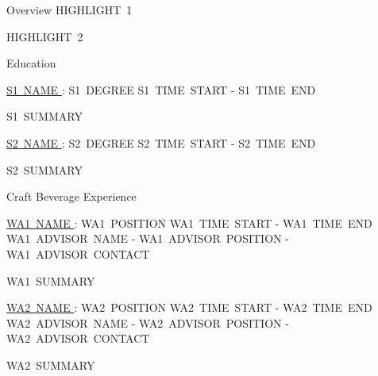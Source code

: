 \documentclass{resume} %
\begin{document}
  

  \begin{rSection}{Overview}
    HIGHLIGHT~1

    HIGHLIGHT~2
  \end{rSection}

  \begin{rSection}{Education}

    \begin{rSubsection}{\underline{S1~NAME }: S1~DEGREE }{ S1~TIME~START - S1~TIME~END }{}

      \item S1~SUMMARY

    \end{rSubsection}
    
    \begin{rSubsection}{\underline{S2~NAME }: S2~DEGREE }{ S2~TIME~START - S2~TIME~END }{}

      \item S2~SUMMARY

    \end{rSubsection}

  \end{rSection}

  \begin{rSection}{Craft Beverage Experience}

    \begin{rSubsection}{\underline{WA1~NAME }: WA1~POSITION }{ WA1~TIME~START - WA1~TIME~END }{ WA1~ADVISOR~NAME - WA1~ADVISOR~POSITION - WA1~ADVISOR~CONTACT }

      \item WA1~SUMMARY

    \end{rSubsection}

    \begin{rSubsection}{\underline{WA2~NAME }: WA2~POSITION }{ WA2~TIME~START - WA2~TIME~END }{ WA2~ADVISOR~NAME - WA2~ADVISOR~POSITION - WA2~ADVISOR~CONTACT }

      \item WA2~SUMMARY


      

    \end{rSubsection}

  \end{rSection}
\end{document}
